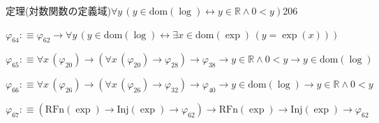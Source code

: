 \begin{fullproof}{定理(対数関数の定義域)}{$\forall y\,(y \in \mathrm{dom}(\log) \leftrightarrow y \in \mathbb{R} \land 0 < y)$}{206}
\begin{abbrevlist}
\item $\varphi_{64} :\equiv \varphi_{62} \to \forall y\,(y \in \mathrm{dom}(\log) \leftrightarrow \exists x \in \mathrm{dom}(\exp)\,(y = \exp(x)))$
\item $\varphi_{65} :\equiv \forall x\,(\varphi_{20}) \to (\forall x\,(\varphi_{20}) \to \varphi_{28}) \to \varphi_{38} \to y \in \mathbb{R} \land 0 < y \to y \in \mathrm{dom}(\log)$
\item $\varphi_{66} :\equiv \forall x\,(\varphi_{26}) \to (\forall x\,(\varphi_{26}) \to \varphi_{32}) \to \varphi_{40} \to y \in \mathrm{dom}(\log) \to y \in \mathbb{R} \land 0 < y$
\item $\varphi_{67} :\equiv (\mathrm{RFn}(\exp) \to \mathrm{Inj}(\exp) \to \varphi_{62}) \to \mathrm{RFn}(\exp) \to \mathrm{Inj}(\exp) \to \varphi_{62}$
\end{abbrevlist}
\end{fullproof}
